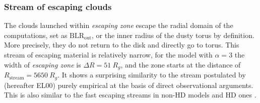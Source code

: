 \documentclass[twocolumn]{aastex62}
\begin{document}
\subsubsection{Stream of escaping clouds}\label{sec:escapingstream}

The clouds launched within \emph{escaping zone} escape the radial domain of the computations, set as $\mathrm{BLR}_{\mathrm{out}}$, or the inner radius of the dusty torus by definition. More precisely, they do not return to the disk and directly go to torus. This stream of escaping material is relatively narrow, for the model with $\alpha = 3$ the width of \emph{escaping zone} is $\Delta R = 51\ R_g$, and the zone starts at the distance of $R_{\mathrm{stream}} = 5650\ R_g$. It shows a surprising similarity to the stream postulated by \citet{elvis2000} (hereafter EL00) purely empirical at the basis of direct observational arguments.
This is also similar to the fast escaping streams in non-HD models \citep[][]{Risaliti2010, Nomura2013} and HD ones \citep[][]{proga1998, proga1999, proga2000, proga2004, Sim2010, Nomura2020}.
\end{document}
